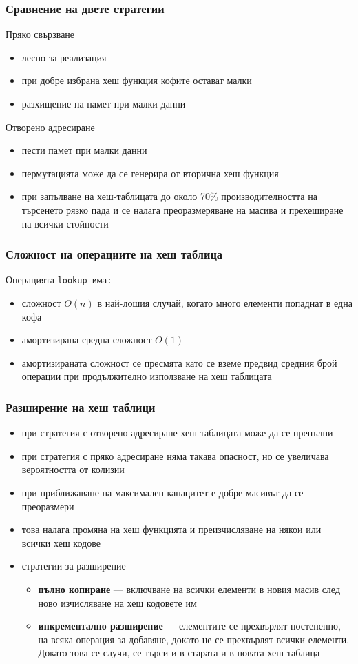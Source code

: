 \documentclass[alsotrans]{beamerswitch}
\begin{document}
\begin{frame}
  \frametitle{Сравнение на двете стратегии}
  Пряко свързване
  \begin{itemize}[<+->]
  \item лесно за реализация
  \item при добре избрана хеш функция кофите остават малки
  \item разхищение на памет при малки данни
  \end{itemize}
  \onslide<+->
  Отворено адресиране
  \begin{itemize}[<+->]
  \item пести памет при малки данни
  \item пермутацията може да се генерира от вторична хеш функция
  \item при запълване на хеш-таблицата до около 70\% производителността на търсенето рязко пада и се налага преоразмеряване на масива и прехеширане на всички стойности
  \end{itemize}
\end{frame}

\begin{frame}
  \frametitle{Сложност на операциите на хеш таблица}
  Операцията \tt{lookup} има:
  \begin{itemize}[<+->]
  \item сложност $O(n)$ в най-лошия случай, когато много елементи попаднат в една кофа
  \item \alert{амортизирана средна сложност $O(1)$}
  \item амортизираната сложност се пресмята като се вземе предвид средния брой операции при продължително използване на хеш таблицата
  \end{itemize}
\end{frame}

\begin{frame}
  \frametitle{Разширение на хеш таблици}
  \begin{itemize}[<+->]
  \item при стратегия с отворено адресиране хеш таблицата може да се препълни
  \item при стратегия с пряко адресиране няма такава опасност, но се увеличава вероятността от колизии
  \item при приближаване на максимален капацитет е добре масивът да се преоразмери
  \item това налага промяна на хеш функцията и преизчисляване на някои или всички хеш кодове
  \item стратегии за разширение
    \begin{itemize}
    \item \textbf{пълно копиране} --- включване на всички елементи в новия масив след ново изчисляване на хеш кодовете им
    \item \textbf{инкрементално разширение} --- елементите се прехвърлят постепенно, на всяка операция за добавяне, докато не се прехвърлят всички елементи. Докато това се случи, се търси и в старата и в новата хеш таблица
    \end{itemize}
  \end{itemize}
\end{frame}
\end{document}
